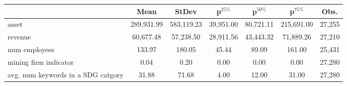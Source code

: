 
\begin{tabular}{lcccccc}
\toprule
  & Mean & StDev & p$^{25\%}$ & p$^{50\%}$ & p$^{75\%}$ & Obs.\\
\midrule
asset & 289,931.99 & 583,119.23 & 39,951.00 & 80,721.11 & 215,691.00 & 27,255\\
revenue & 60,677.48 & 57,238.50 & 28,911.56 & 43,443.32 & 71,889.26 & 27,210\\
num employees & 133.97 & 180.05 & 45.44 & 89.09 & 161.00 & 25,431\\
mining firm indicator & 0.04 & 0.20 & 0.00 & 0.00 & 0.00 & 27,280\\
avg. num keywords in a SDG catgory & 31.88 & 71.68 & 4.00 & 12.00 & 31.00 & 27,280\\
\bottomrule
\end{tabular}
